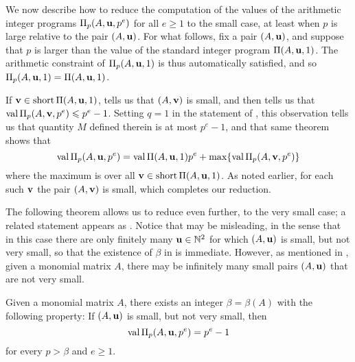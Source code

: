\documentclass{amsart}
\begin{document}
\begin{remark}
   We now describe how to reduce the computation of the values of the arithmetic integer programs $\Pi_p(A, \mathbf{u}, p^e)$ for all $e \geq 1$ to the small case, at least when $p$ is large relative to the pair $(A, \mathbf{u})$.
   For what follows, fix a pair $(A, \mathbf{u})$, and suppose that $p$ is larger than the value of the standard integer program $\Pi(A, \mathbf{u},1)$.
   The arithmetic constraint of $\Pi_p(A,\mathbf{u},1)$ is thus automatically satisfied, and so $\Pi_p(A, \mathbf{u}, 1) = \Pi(A, \mathbf{u}, 1)$.

   If $\mathbf{v} \in \operatorname{short} \Pi(A,\mathbf{u},1)$,  tells us that $(A, \mathbf{v})$ is small, and   then tells us that $\operatorname{val} \Pi_p(A, \mathbf{v}, p^e) \leqslant p^e-1$.
   Setting $q=1$ in the statement of , this observation tells us that quantity $M$ defined therein is at most $p^e-1$, and that same theorem shows that
   \[ \operatorname{val} \Pi_p(A, \mathbf{u},p^e) = \operatorname{val} \Pi(A, \mathbf{u},1)p^e + \max \{ \operatorname{val} \Pi_p(A, \mathbf{v}, p^e) \}\]
   where the maximum is over all $\mathbf{v} \in \operatorname{short} \Pi(A, \mathbf{u},1)$.
   As noted earlier, for each such $\mathbf{v}$ the pair $(A,\mathbf{v})$ is small, which completes our reduction.
\end{remark}

The following theorem allows us to reduce even further, to the very small case; a related statement appears as \cite[Theorem~6.4]{hernandez+etal.frobenius_powers}.
Notice that  may be misleading, in the sense that in this case there are only finitely many $\mathbf{u} \in \mathbb{N}^2$ for which $(A, \mathbf{u})$ is small, but not very small, so that the existence of $\beta$ in  is immediate.
However, as mentioned in , given a monomial matrix $A$, there may be infinitely many small pairs $(A, \mathbf{u})$ that are not very small.

\begin{theorem}
   \label{small not very small value: T}
   Given a monomial matrix $A$, there exists an integer $\beta=\beta(A)$ with the following property\textup:
   If $(A, \mathbf{u})$ is small, but not very small, then
   \[ \operatorname{val} \Pi_p(A, \mathbf{u}, p^e) = p^e-1\]
   for every $p > \beta$ and $e \geq 1$.
\end{theorem}
\end{document}
